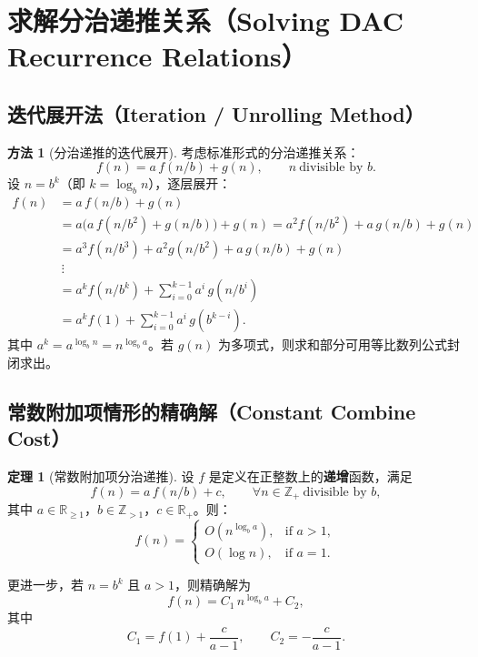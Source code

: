 \documentclass[UTF8,11pt,a4paper]{ctexbook}   %
\theoremstyle{definition}
\newtheorem{theorem}{定理}[section]
\newtheorem{method}{方法}[section]
\begin{document}
\section{求解分治递推关系（Solving DAC Recurrence Relations）}

\subsection{迭代展开法（Iteration / Unrolling Method）}

\begin{method}[分治递推的迭代展开]
考虑标准形式的分治递推关系：
\[
f(n) = a\,f(n/b) + g(n),\qquad n\ \text{divisible by } b.
\]
设 $n = b^k$（即 $k = \log_b n$），逐层展开：
\begin{align*}
f(n) &= a\,f(n/b) + g(n)\\
&= a\bigl(a\,f(n/b^2) + g(n/b)\bigr) + g(n) = a^2 f(n/b^2) + a\,g(n/b) + g(n)\\
&= a^3 f(n/b^3) + a^2 g(n/b^2) + a\,g(n/b) + g(n)\\
&\ \vdots\\
&= a^k f(n/b^k) + \sum_{i=0}^{k-1} a^i\,g(n/b^i)\\
&= a^k f(1) + \sum_{i=0}^{k-1} a^i\,g(b^{k-i}).
\end{align*}
其中 $a^k = a^{\log_b n} = n^{\log_b a}$。若 $g(n)$ 为多项式，则求和部分可用等比数列公式封闭求出。
\end{method}

\subsection{常数附加项情形的精确解（Constant Combine Cost）}

\begin{theorem}[常数附加项分治递推]\label{thm:dac-constant}
设 $f$ 是定义在正整数上的\textbf{递增}函数，满足
\[
f(n) = a\,f(n/b) + c,\qquad \forall n\in\mathbb{Z}_+\ \text{divisible by } b,
\]
其中 $a\in\mathbb{R}_{\ge 1}$，$b\in\mathbb{Z}_{>1}$，$c\in\mathbb{R}_+$。则：
\[
f(n) =
\begin{cases}
O(n^{\log_b a}), & \text{if } a > 1,\\[0.5em]
O(\log n), & \text{if } a = 1.
\end{cases}
\]

更进一步，若 $n=b^k$ 且 $a>1$，则精确解为
\[
f(n) = C_1\,n^{\log_b a} + C_2,
\]
其中
\[
C_1 = f(1) + \frac{c}{a-1},\qquad C_2 = -\frac{c}{a-1}.
\]
\end{theorem}
\end{document}
